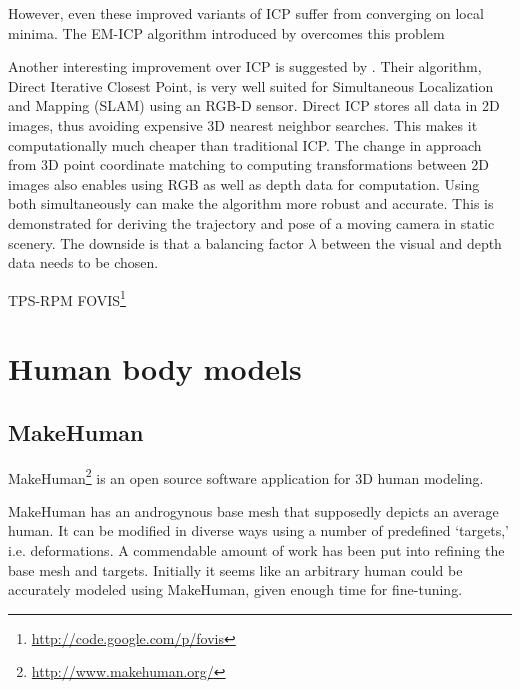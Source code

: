 However, even these improved variants of ICP suffer from converging on local minima. The EM-ICP  algorithm introduced by \citet{granger2006multi} overcomes this problem 


Another interesting improvement over ICP is suggested by \citet{tykkala2011direct}. Their algorithm, Direct Iterative Closest Point, is very well suited for Simultaneous Localization and Mapping (SLAM) using an RGB-D sensor. Direct ICP stores all data in 2D images, thus avoiding expensive 3D nearest neighbor searches. This makes it computationally much cheaper than traditional ICP. The change in approach from 3D point coordinate matching to computing transformations between 2D images also enables using RGB as well as depth data for computation. Using both simultaneously can make the algorithm more robust and accurate. This is demonstrated for deriving the trajectory and pose of a moving camera in static scenery. The downside is that a balancing factor $\lambda$ between the visual and depth data needs to be chosen.

\citep{chui2003new} TPS-RPM \citep{yang2011thin}
\citep{huang2011visual} FOVIS\footnote{\url{http://code.google.com/p/fovis}}


\section{Human body models}
\citep{anguelov2005scape}
\citep{baek2012parametric}

\subsection{MakeHuman}


MakeHuman\footnote{\url{http://www.makehuman.org/}} is an open source software application for 3D human modeling.

MakeHuman has an androgynous base mesh that supposedly depicts an average human. It can be modified in diverse ways using a number of predefined `targets,' i.e. deformations. A commendable amount of work has been put into refining the base mesh and targets. Initially it seems like an arbitrary human could be accurately modeled using MakeHuman, given enough time for fine-tuning.

